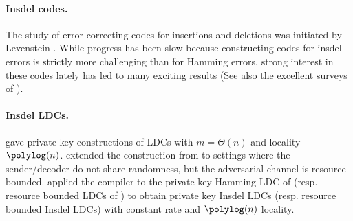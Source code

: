 \paragraph{Insdel codes.} The study of error correcting codes for insertions and deletions was initiated by Levenstein \cite{Levenshtein_SPD66}. While  progress has been slow because constructing codes for insdel errors is strictly more challenging than for Hamming errors, strong interest in these codes lately has led to many exciting results  \cite{SchZuc99, Kiwi_expectedlength, guruswami2017deletion,HaeuplerS17, GuruswamiL18,HaeuplerSS18,HaeuplerS18,BrakensiekGZ18, ChengJLW18, ChengHLSW19, ChengJ0W19, GuruswamiL19,HaeuplerRS19,Haeupler19,  LiuTX20,GuruswamiHS20, ChengGHL21, ChengL21} (See also the excellent surveys of \cite{Sloane2002OnSC,Mercier2010ASO,Mitzenmachen-survey, haeupler2021synchronization}).

 

\paragraph{Insdel LDCs.} 
\cite{OPS07} gave private-key constructions of LDCs with  $m=\Theta(n)$ and locality $\polylog(n)$. \cite{BlockiKZ19} extended the construction from \cite{OPS07} to settings where the sender/decoder do not share randomness, but the adversarial channel is resource bounded. 
\cite{block2021private} applied the \cite{BlockBGKZ20} compiler to the private key Hamming LDC of \cite{OPS07} (resp. resource bounded LDCs of \cite{BlockiKZ19}) to obtain private key Insdel LDCs (resp. resource bounded Insdel LDCs) with constant rate and $\polylog(n)$ locality.

